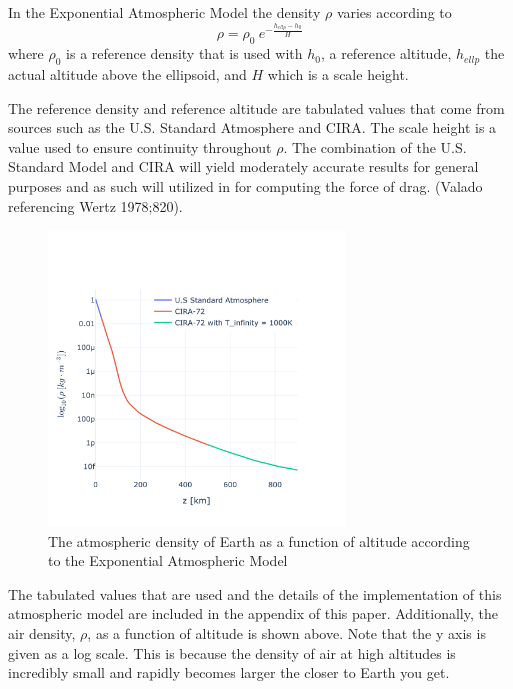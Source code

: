 \documentclass{article}
\begin{document}
In the Exponential Atmospheric Model the density $\rho$ varies according to
\begin{equation}
	\rho = \rho_0\:e^{-\frac{h_{ellp} - h_0}{H}}
\end{equation}
where $\rho_0$ is a reference density that is used with $h_0$,  a reference altitude,  $h_{ellp}$ the actual altitude above the ellipsoid, and $H$ which is a scale height.

The reference density and reference altitude are tabulated values that come from sources such as the U.S. Standard Atmosphere and CIRA. The scale height is a value used to ensure continuity throughout $\rho$. The combination of the U.S. Standard Model and CIRA will yield moderately accurate results for general purposes and as such will utilized in for computing the force of drag. (Valado referencing Wertz 1978;820).

\begin{figure}[H]
	\centering     %
	\vspace*{-1.5in}
	\includegraphics[width=0.7\textwidth]{Atmospheric_Density_v_Altitude}
	\caption{The atmospheric density of Earth as a function of altitude according to the Exponential Atmospheric Model}
\end{figure}

The tabulated values that are used and the details of the implementation of this atmospheric model are included in the appendix of this paper. Additionally, the air density, $\rho$, as a function of altitude is shown above. Note that the y axis is given as a log scale. This is because the density of air at high altitudes is incredibly small and rapidly becomes larger the closer to Earth you get.
\end{document}
